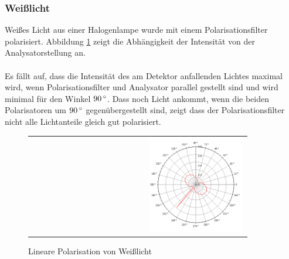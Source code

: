 \documentclass[a4paper,titlepage]{scrartcl}
\numberwithin{equation}{section}
\begin{document}
\subsubsection{Weißlicht}
Weißes Licht aus einer Halogenlampe wurde mit einem Polarisationsfilter polarisiert. Abbildung \ref{fig:aufgabe1a} zeigt die Abhängigkeit der Intensität von der Analysatorstellung an.\\ \\
Es fällt auf, dass die Intensität des am Detektor anfallenden Lichtes maximal wird, wenn Polarisationsfilter und Analysator parallel gestellt sind und wird minimal für den Winkel $\unit[90]{^\circ}$. Dass noch Licht ankommt, wenn die beiden Polarisatoren um $\unit[90]{^\circ}$ gegenübergestellt sind, zeigt dass der Polarisationsfilter nicht alle Lichtanteile gleich gut polarisiert.
\begin{figure}[H]
	\centering
	\begin{tabular}{@{}r@{}}
		\includegraphics[width=0.45\textwidth]{bilder/1a.png}\\
	\end{tabular}
	\caption{Lineare Polarisation von Weißlicht}
	\label{fig:aufgabe1a}
\end{figure}
\end{document}
